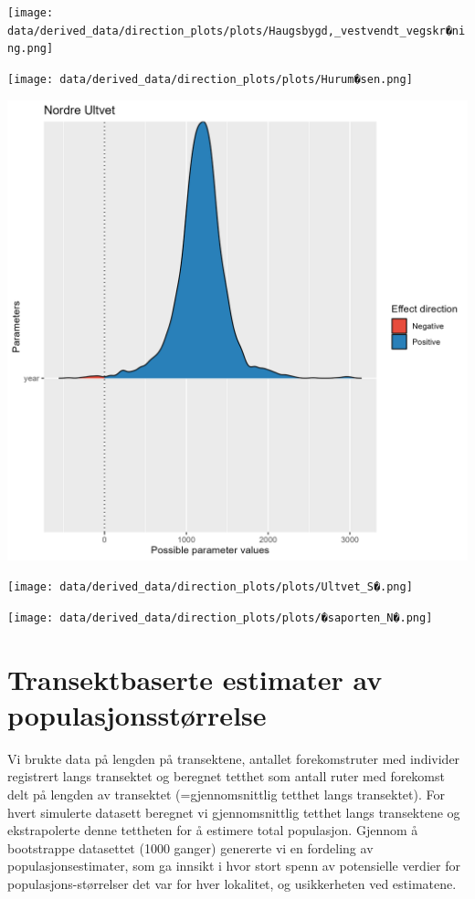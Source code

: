 \documentclass[
  letterpaper,
  DIV=11,
  numbers=noendperiod]{scrreport}
\begin{document}
\texttt{[image: data/derived\_data/direction\_plots/plots/Haugsbygd,\_vestvendt\_vegskr�ning.png]}

\texttt{[image: data/derived\_data/direction\_plots/plots/Hurum�sen.png]}

\includegraphics{data/derived_data/direction_plots/plots/Nordre_Ultvet.png}

\texttt{[image: data/derived\_data/direction\_plots/plots/Ultvet\_S�.png]}

\texttt{[image: data/derived\_data/direction\_plots/plots/�saporten\_N�.png]}


\hypertarget{transektbaserte-estimater-av-populasjonsstuxf8rrelse}{%
\chapter{Transektbaserte estimater av
populasjonsstørrelse}\label{transektbaserte-estimater-av-populasjonsstuxf8rrelse}}

Vi brukte data på lengden på transektene, antallet forekomstruter med
individer registrert langs transektet og beregnet tetthet som antall
ruter med forekomst delt på lengden av transektet (=gjennomsnittlig
tetthet langs transektet). For hvert simulerte datasett beregnet vi
gjennomsnittlig tetthet langs transektene og ekstrapolerte denne
tettheten for å estimere total populasjon. Gjennom å bootstrappe
datasettet (1000 ganger) genererte vi en fordeling av
populasjonsestimater, som ga innsikt i hvor stort spenn av potensielle
verdier for populasjons-størrelser det var for hver lokalitet, og
usikkerheten ved estimatene.
\end{document}
